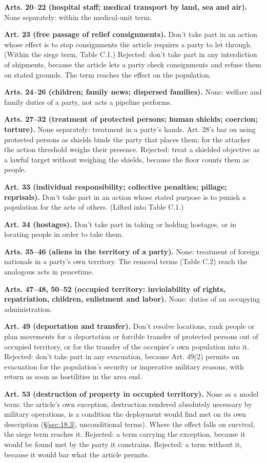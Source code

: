 \textbf{Arts. 20–22 (hospital staff; medical transport by land, sea and air).} None separately: within the medical-unit term.

\textbf{Art. 23 (free passage of relief consignments).} Don't take part in an action whose effect is to stop consignments the article requires a party to let through. (Within the siege term, Table C.1.) Rejected: don't take part in any interdiction of shipments, because the article lets a party check consignments and refuse them on stated grounds. The term reaches the effect on the population.

\textbf{Arts. 24–26 (children; family news; dispersed families).} None: welfare and family duties of a party, not acts a pipeline performs.

\textbf{Arts. 27–32 (treatment of protected persons; human shields; coercion; torture).} None separately: treatment in a party's hands. Art. 28's bar on using protected persons as shields binds the party that places them; for the attacker the action threshold weighs their presence. Rejected: treat a shielded objective as a lawful target without weighing the shields, because the floor counts them as people.

\textbf{Art. 33 (individual responsibility; collective penalties; pillage; reprisals).} Don't take part in an action whose stated purpose is to punish a population for the acts of others. (Lifted into Table C.1.)

\textbf{Art. 34 (hostages).} Don't take part in taking or holding hostages, or in locating people in order to take them.

\textbf{Arts. 35–46 (aliens in the territory of a party).} None: treatment of foreign nationals in a party's own territory. The removal terms (Table C.2) reach the analogous acts in peacetime.

\textbf{Arts. 47–48, 50–52 (occupied territory: inviolability of rights, repatriation, children, enlistment and labor).} None: duties of an occupying administration.

\textbf{Art. 49 (deportation and transfer).} Don't resolve locations, rank people or plan movements for a deportation or forcible transfer of protected persons out of occupied territory, or for the transfer of the occupier's own population into it. Rejected: don't take part in any evacuation, because Art. 49(2) permits an evacuation for the population's security or imperative military reasons, with return as soon as hostilities in the area end.

\textbf{Art. 53 (destruction of property in occupied territory).} None as a model term: the article's own exception, destruction rendered absolutely necessary by military operations, is a condition the deployment would find met on its own description (\S\ref{sec:18.3}, unconditional terms). Where the effect falls on survival, the siege term reaches it. Rejected: a term carrying the exception, because it would be found met by the party it constrains. Rejected: a term without it, because it would bar what the article permits.

